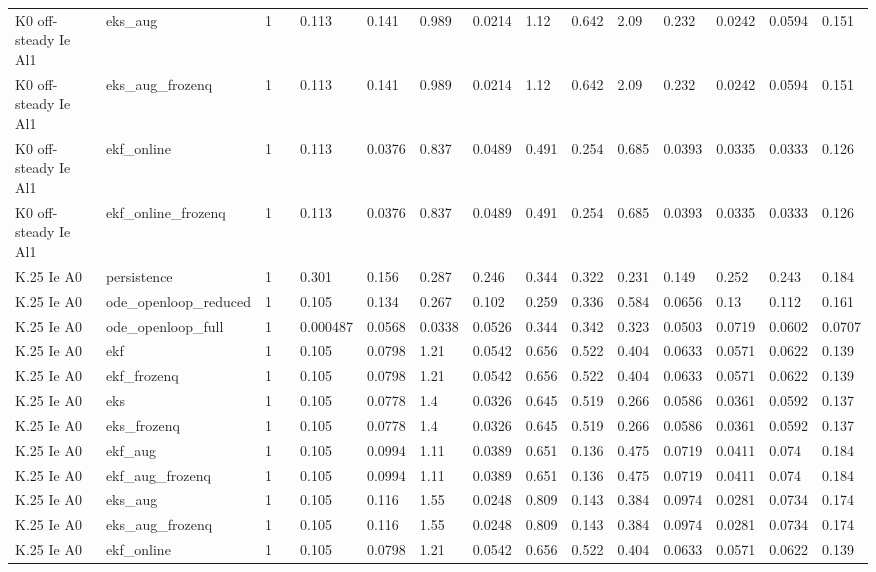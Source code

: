 \begin{table}[t]
\begin{tabular}{lllllllllllllll}
K0 off-steady Ie Al1 & eks\_aug & 1 &  & 0.113 & 0.141 & 0.989 & 0.0214 & 1.12 & 0.642 & 2.09 & 0.232 & 0.0242 & 0.0594 & 0.151 \\
K0 off-steady Ie Al1 & eks\_aug\_frozenq & 1 &  & 0.113 & 0.141 & 0.989 & 0.0214 & 1.12 & 0.642 & 2.09 & 0.232 & 0.0242 & 0.0594 & 0.151 \\
K0 off-steady Ie Al1 & ekf\_online & 1 &  & 0.113 & 0.0376 & 0.837 & 0.0489 & 0.491 & 0.254 & 0.685 & 0.0393 & 0.0335 & 0.0333 & 0.126 \\
K0 off-steady Ie Al1 & ekf\_online\_frozenq & 1 &  & 0.113 & 0.0376 & 0.837 & 0.0489 & 0.491 & 0.254 & 0.685 & 0.0393 & 0.0335 & 0.0333 & 0.126 \\
K.25 Ie A0 & persistence & 1 &  & 0.301 & 0.156 & 0.287 & 0.246 & 0.344 & 0.322 & 0.231 & 0.149 & 0.252 & 0.243 & 0.184 \\
K.25 Ie A0 & ode\_openloop\_reduced & 1 &  & 0.105 & 0.134 & 0.267 & 0.102 & 0.259 & 0.336 & 0.584 & 0.0656 & 0.13 & 0.112 & 0.161 \\
K.25 Ie A0 & ode\_openloop\_full & 1 &  & 0.000487 & 0.0568 & 0.0338 & 0.0526 & 0.344 & 0.342 & 0.323 & 0.0503 & 0.0719 & 0.0602 & 0.0707 \\
K.25 Ie A0 & ekf & 1 &  & 0.105 & 0.0798 & 1.21 & 0.0542 & 0.656 & 0.522 & 0.404 & 0.0633 & 0.0571 & 0.0622 & 0.139 \\
K.25 Ie A0 & ekf\_frozenq & 1 &  & 0.105 & 0.0798 & 1.21 & 0.0542 & 0.656 & 0.522 & 0.404 & 0.0633 & 0.0571 & 0.0622 & 0.139 \\
K.25 Ie A0 & eks & 1 &  & 0.105 & 0.0778 & 1.4 & 0.0326 & 0.645 & 0.519 & 0.266 & 0.0586 & 0.0361 & 0.0592 & 0.137 \\
K.25 Ie A0 & eks\_frozenq & 1 &  & 0.105 & 0.0778 & 1.4 & 0.0326 & 0.645 & 0.519 & 0.266 & 0.0586 & 0.0361 & 0.0592 & 0.137 \\
K.25 Ie A0 & ekf\_aug & 1 &  & 0.105 & 0.0994 & 1.11 & 0.0389 & 0.651 & 0.136 & 0.475 & 0.0719 & 0.0411 & 0.074 & 0.184 \\
K.25 Ie A0 & ekf\_aug\_frozenq & 1 &  & 0.105 & 0.0994 & 1.11 & 0.0389 & 0.651 & 0.136 & 0.475 & 0.0719 & 0.0411 & 0.074 & 0.184 \\
K.25 Ie A0 & eks\_aug & 1 &  & 0.105 & 0.116 & 1.55 & 0.0248 & 0.809 & 0.143 & 0.384 & 0.0974 & 0.0281 & 0.0734 & 0.174 \\
K.25 Ie A0 & eks\_aug\_frozenq & 1 &  & 0.105 & 0.116 & 1.55 & 0.0248 & 0.809 & 0.143 & 0.384 & 0.0974 & 0.0281 & 0.0734 & 0.174 \\
K.25 Ie A0 & ekf\_online & 1 &  & 0.105 & 0.0798 & 1.21 & 0.0542 & 0.656 & 0.522 & 0.404 & 0.0633 & 0.0571 & 0.0622 & 0.139 \\

\end{tabular}
\end{table}
